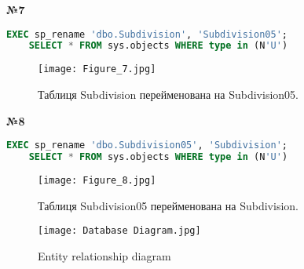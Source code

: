 \documentclass[a4paper,12pt]{article}
\begin{document}
\newpage
	\begin{center}
		\textbf{№7}
	\end{center}
	\begin{lstlisting}[language=SQL]
	EXEC sp_rename 'dbo.Subdivision', 'Subdivision05';
	SELECT * FROM sys.objects WHERE type in (N'U')
	\end{lstlisting}
	\begin{figure}[h!]
		\centering
		\begin{minipage}[h]{0.8\linewidth}
			\texttt{[image: Figure\_7.jpg]}  
		\end{minipage}
		\caption{Таблиця Subdivision перейменована на Subdivision05.}
	\end{figure}
	\begin{center}
		\textbf{№8}
	\end{center}
	\begin{lstlisting}[language=SQL]
	EXEC sp_rename 'dbo.Subdivision05', 'Subdivision';
	SELECT * FROM sys.objects WHERE type in (N'U')
	\end{lstlisting}
	\begin{figure}[h!]
		\centering
		\begin{minipage}[h]{0.8\linewidth}
			\texttt{[image: Figure\_8.jpg]}  
		\end{minipage}
		\caption{Таблиця Subdivision05 перейменована на Subdivision.}
	\end{figure}
	
	
	
	
	
	
\newpage
		\begin{figure}[h!]
		\begin{center}
			\begin{minipage}[h]{1.05\linewidth}
				\texttt{[image: Database Diagram.jpg]}
			\end{minipage}
		\end{center}
		\caption{Entity relationship diagram}
	\end{figure}
	
	
	
\end{document}
